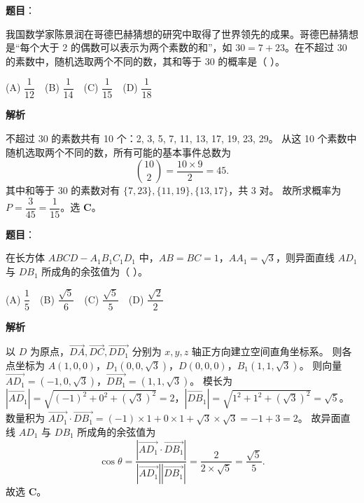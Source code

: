 \begin{answer}

\textbf{题目}：

我国数学家陈景润在哥德巴赫猜想的研究中取得了世界领先的成果。哥德巴赫猜想是“每个大于 2 的偶数可以表示为两个素数的和”，如 $30=7+23$。在不超过 30 的素数中，随机选取两个不同的数，其和等于 30 的概率是（ ）。

(A) $\dfrac{1}{12}$　(B) $\dfrac{1}{14}$　(C) $\dfrac{1}{15}$　(D) $\dfrac{1}{18}$

\textbf{解析}

不超过 30 的素数共有 10 个：2, 3, 5, 7, 11, 13, 17, 19, 23, 29。
从这 10 个素数中随机选取两个不同的数，所有可能的基本事件总数为
\nopagebreak[4]
\[\binom{10}{2} = \dfrac{10\times 9}{2} = 45.\]
其中和等于 30 的素数对有 $\{7, 23\}, \{11, 19\}, \{13, 17\}$，共 3 对。
故所求概率为 $P = \dfrac{3}{45} = \dfrac{1}{15}$。选 \textbf{C}。


\end{answer}
\begin{answer}

\textbf{题目}：

在长方体 $ABCD-A_1B_1C_1D_1$ 中，$AB=BC=1$，$AA_1=\sqrt3$，则异面直线 $AD_1$ 与 $DB_1$ 所成角的余弦值为（ ）。

(A) $\dfrac15$　(B) $\dfrac{\sqrt5}{6}$　(C) $\dfrac{\sqrt5}{5}$　(D) $\dfrac{\sqrt2}{2}$

\textbf{解析}

以 $D$ 为原点，$\vec{DA}, \vec{DC}, \vec{DD_1}$ 分别为 $x, y, z$ 轴正方向建立空间直角坐标系。
则各点坐标为 $A(1,0,0)$，$D_1(0,0,\sqrt3)$，$D(0,0,0)$，$B_1(1,1,\sqrt3)$。
则向量 $\vec{AD_1} = (-1, 0, \sqrt3)$，$\vec{DB_1} = (1, 1, \sqrt3)$。
模长为 $|\vec{AD_1}| = \sqrt{(-1)^2+0^2+(\sqrt3)^2} = 2$，$|\vec{DB_1}| = \sqrt{1^2+1^2+(\sqrt3)^2} = \sqrt5$。
数量积为 $\vec{AD_1}\cdot\vec{DB_1} = (-1)\times 1 + 0\times 1 + \sqrt3\times\sqrt3 = -1 + 3 = 2$。
故异面直线 $AD_1$ 与 $DB_1$ 所成角的余弦值为
\nopagebreak[4]
\[\cos\theta = \dfrac{|\vec{AD_1}\cdot\vec{DB_1}|}{|\vec{AD_1}||\vec{DB_1}|} = \dfrac{2}{2\times\sqrt5} = \dfrac{\sqrt5}{5}.\]
故选 \textbf{C}。


\end{answer}

